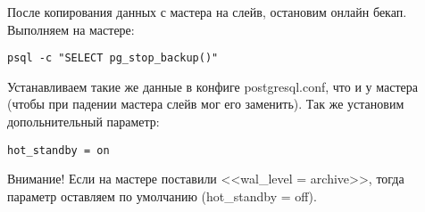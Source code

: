 После копирования данных с мастера на слейв, остановим онлайн бекап. Выполняем на мастере:
\begin{lstlisting}[label=lst:streaming12,caption=Выполняем на мастере]
psql -c "SELECT pg_stop_backup()"
\end{lstlisting}

Устанавливаем такие же данные в конфиге postgresql.conf, что и у мастера (чтобы при падении мастера слейв мог его заменить). 
Так же установим допольнительный параметр:
\begin{lstlisting}[label=lst:streaming13,caption=Конфиг слейва]
hot_standby = on
\end{lstlisting}
Внимание! Если на мастере поставили <<wal\_level = archive>>, тогда параметр оставляем по умолчанию (hot\_standby = off).

